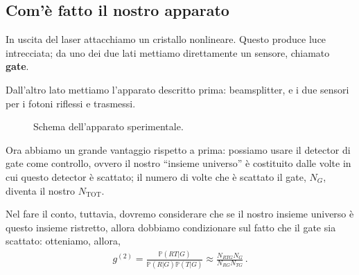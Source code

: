 \documentclass[a4paper,12pt]{article}
\begin{document}
\subsection{Com'è fatto il nostro apparato}



In uscita del laser attacchiamo un cristallo nonlineare. 
Questo produce luce intrecciata; da uno dei due lati mettiamo direttamente un sensore, chiamato \textbf{gate}. 

Dall'altro lato mettiamo l'apparato descritto prima: beamsplitter, e i due sensori per i fotoni riflessi e trasmessi.

\begin{figure}[ht]
\centering

\caption{Schema dell'apparato sperimentale.}
\label{fig:spdc}
\end{figure}

Ora abbiamo un grande vantaggio rispetto a prima: possiamo usare il detector di gate come controllo, ovvero il nostro ``insieme universo'' è costituito dalle volte in cui questo detector è scattato; il numero di volte che è scattato il gate, \(N_G\), diventa il nostro \(N _{\text{TOT}} \).

Nel fare il conto, tuttavia, dovremo considerare che se il nostro insieme universo è questo insieme ristretto, allora dobbiamo condizionare sul fatto che il gate sia scattato: otteniamo, allora, 
%
\begin{align}
g^{(2)} = \frac{\mathbb{P}(RT | G)}{\mathbb{P}(R|G) \mathbb{P}(T|G)}
\approx \frac{N_{RTG} N_G}{N_{RG} N_{TG}}
\,.
\end{align}
\end{document}
